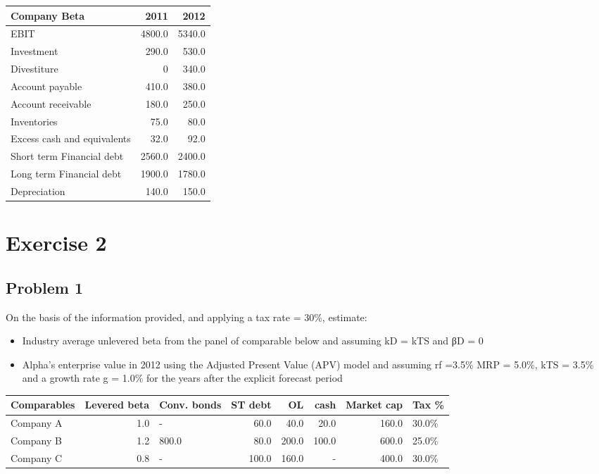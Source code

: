 \documentclass[11pt]{article}
\begin{document}
\begin{center}
\begin{tabular}{lrr}
Company Beta & 2011 & 2012\\
\hline
EBIT & 4800.0 & 5340.0\\
Investment & 290.0 & 530.0\\
Divestiture & 0 & 340.0\\
Account payable & 410.0 & 380.0\\
Account receivable & 180.0 & 250.0\\
Inventories & 75.0 & 80.0\\
Excess cash and equivalents & 32.0 & 92.0\\
Short term Financial debt & 2560.0 & 2400.0\\
Long term Financial debt & 1900.0 & 1780.0\\
Depreciation & 140.0 & 150.0\\
\end{tabular}
\end{center}

\section*{Exercise 2}
\label{sec:orgba1c946}
\subsection*{Problem 1}
\label{sec:org45d6ace}
On the basis of the information provided, and applying a tax rate = 30\%, estimate:\\
\begin{itemize}
\item Industry average unlevered beta from the panel of comparable below and assuming kD = kTS and βD = 0\\
\item Alpha’s enterprise value in 2012 using the Adjusted Present Value (APV) model and assuming rf =3.5\% MRP = 5.0\%, kTS = 3.5\% and a growth rate g = 1.0\% for the years after the explicit forecast period\\
\end{itemize}

\begin{center}
\begin{tabular}{lrlrrrrl}
Comparables & Levered beta & Conv. bonds & ST debt & OL & cash & Market cap & Tax \%\\
\hline
Company A & 1.0 & - & 60.0 & 40.0 & 20.0 & 160.0 & 30.0\%\\
Company B & 1.2 & 800.0 & 80.0 & 200.0 & 100.0 & 600.0 & 25.0\%\\
Company C & 0.8 & - & 100.0 & 160.0 & - & 400.0 & 30.0\%\\
\end{tabular}
\end{center}
\end{document}
